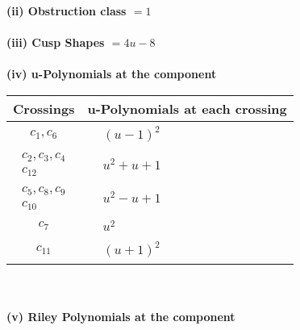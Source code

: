 \documentclass[1p]{elsarticle_modified}
\theoremstyle{definition}
\begin{document}
\flushleft \textbf{(ii) Obstruction class $= 1$}\\~\\
\flushleft \textbf{(iii) Cusp Shapes $= 4 u-8$}\\~\\
\newpage\renewcommand{\arraystretch}{1}
\flushleft \textbf{(iv) u-Polynomials at the component}\newline \\
\begin{tabular}{m{50pt}|m{274pt}}
Crossings & \hspace{64pt}u-Polynomials at each crossing \\
\hline $$\begin{aligned}c_{1},c_{6}\end{aligned}$$&$\begin{aligned}
&(u-1)^2
\end{aligned}$\\
\hline $$\begin{aligned}c_{2},c_{3},c_{4}\\c_{12}\end{aligned}$$&$\begin{aligned}
&u^2+u+1
\end{aligned}$\\
\hline $$\begin{aligned}c_{5},c_{8},c_{9}\\c_{10}\end{aligned}$$&$\begin{aligned}
&u^2- u+1
\end{aligned}$\\
\hline $$\begin{aligned}c_{7}\end{aligned}$$&$\begin{aligned}
&u^2
\end{aligned}$\\
\hline $$\begin{aligned}c_{11}\end{aligned}$$&$\begin{aligned}
&(u+1)^2
\end{aligned}$\\
\hline
\end{tabular}\\~\\
\newpage\renewcommand{\arraystretch}{1}
\flushleft \textbf{(v) Riley Polynomials at the component}\newline \\
\end{document}
